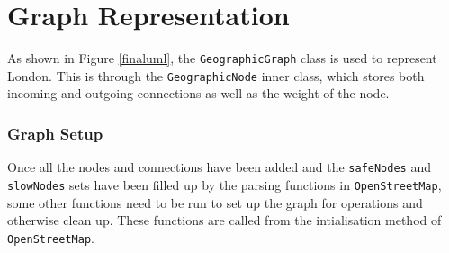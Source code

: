 \documentclass[11pt,twoside,a4paper]{report}
\begin{document}
\section{Graph Representation}
As shown in Figure \ref{finaluml}, the \texttt{GeographicGraph} class is used to represent London. This is through the \texttt{GeographicNode} inner class, which stores both incoming and outgoing connections as well as the weight of the node. 
\subsubsection{Graph Setup}
Once all the nodes and connections have been added and the \texttt{safeNodes} and \texttt{slowNodes} sets have been filled up by the parsing functions in \texttt{OpenStreetMap}, some other functions need to be run to set up the graph for operations and otherwise clean up.
These functions are called from the intialisation method of \texttt{OpenStreetMap}. 
\end{document}
